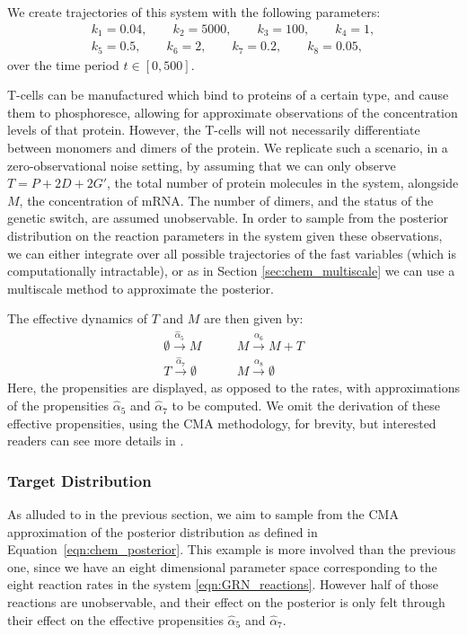 \documentclass[final]{siamltex}
\begin{document}
We create trajectories of this system with the following parameters:
\begin{eqnarray*}
k_1 = 0.04, \qquad
k_2 = 5000, \qquad
k_3 = 100, \qquad
k_4 = 1, \\ 
k_5 = 0.5, \qquad
k_6 = 2, \qquad
k_7 = 0.2, \qquad
k_8 = 0.05,
\end{eqnarray*}
over the time period $t \in [0,500]$.

T-cells can be manufactured which bind to
proteins of a certain type, and cause them to phosphoresce, allowing
for approximate observations of the concentration levels of that
protein. However, the T-cells will not necessarily differentiate
between monomers and dimers of the protein. We replicate such a
scenario, in a zero-observational noise setting, by assuming that we
can only observe $T=P + 2D + 2G'$, the total number of protein
molecules in the system, alongside $M$, the concentration of mRNA. The
number of dimers, and the status of the genetic switch, are assumed
unobservable. In
order to sample from the posterior distribution on the reaction
parameters in the system given these observations, we can either integrate over all possible
trajectories of the fast variables (which is computationally
intractable), or as in Section \ref{sec:chem_multiscale} we can use a
multiscale method to approximate the posterior. 

The effective dynamics of $T$ and $M$ are then given by:
\begin{align}
	\emptyset \xrightarrow{\hat{\alpha}_5} M \quad & \quad M\xrightarrow{\alpha_6} M+T  \label{eqn:GRN_eff} \\
	T \xrightarrow{\hat{\alpha}_7} \emptyset \quad & \quad M \xrightarrow{\alpha_8} \emptyset \nonumber
\end{align}
Here, the propensities are displayed, as opposed to the rates, with
approximations of the propensities $\hat{\alpha}_5$ and
$\hat{\alpha}_7$ to be computed. We omit the derivation of these
effective propensities, using the CMA methodology, for brevity, but
interested readers can see more details in \cite{russ2017parallel}.

\subsubsection{Target Distribution}
As alluded to in the previous section, we aim to sample from the CMA
approximation of the posterior distribution as defined in
Equation~\eqref{eqn:chem_posterior}. This example is more involved
than the previous one, since we have an eight dimensional parameter
space corresponding to the eight reaction rates in the system
\eqref{eqn:GRN_reactions}. However half of those reactions are
unobservable, and their effect on the posterior is only felt through
their effect on the effective propensities $\hat{\alpha}_5$ and $\hat{\alpha}_7$.
\end{document}
